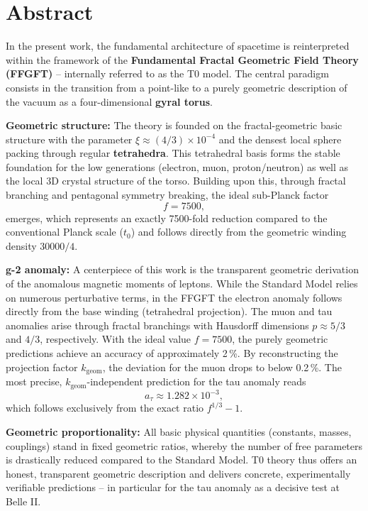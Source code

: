 \section*{Abstract}
		In the present work, the fundamental architecture of spacetime is reinterpreted within the framework of the \textbf{Fundamental Fractal Geometric Field Theory (FFGFT)} -- internally referred to as the T0 model. The central paradigm consists in the transition from a point-like to a purely geometric description of the vacuum as a four-dimensional \textbf{gyral torus}.
		
		\textbf{Geometric structure:} The theory is founded on the fractal-geometric basic structure with the parameter $\xi \approx (4/3)\times 10^{-4}$ and the densest local sphere packing through regular \textbf{tetrahedra}. This tetrahedral basis forms the stable foundation for the low generations (electron, muon, proton/neutron) as well as the local 3D crystal structure of the torso. Building upon this, through fractal branching and pentagonal symmetry breaking, the ideal sub-Planck factor
		\begin{equation*}
			f = 7500,
		\end{equation*}
		emerges, which represents an exactly 7500-fold reduction compared to the conventional Planck scale ($t_0$) and follows directly from the geometric winding density $30000/4$.
		
		\textbf{g-2 anomaly:} A centerpiece of this work is the transparent geometric derivation of the anomalous magnetic moments of leptons. While the Standard Model relies on numerous perturbative terms, in the FFGFT the electron anomaly follows directly from the base winding (tetrahedral projection). The muon and tau anomalies arise through fractal branchings with Hausdorff dimensions $p \approx 5/3$ and $4/3$, respectively. With the ideal value $f = 7500$, the purely geometric predictions achieve an accuracy of approximately 2\,\%. By reconstructing the projection factor $k_\text{geom}$, the deviation for the muon drops to below 0.2\,\%. The most precise, $k_\text{geom}$-independent prediction for the tau anomaly reads
		\begin{equation*}
			a_\tau \approx 1.282 \times 10^{-3},
		\end{equation*}
		which follows exclusively from the exact ratio $f^{1/3} - 1$.
		
		\textbf{Geometric proportionality:} All basic physical quantities (constants, masses, couplings) stand in fixed geometric ratios, whereby the number of free parameters is drastically reduced compared to the Standard Model. T0 theory thus offers an honest, transparent geometric description and delivers concrete, experimentally verifiable predictions -- in particular for the tau anomaly as a decisive test at Belle II.

